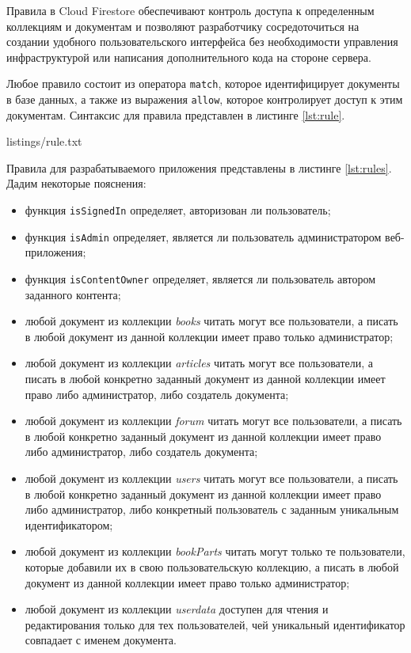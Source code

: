 Правила в Cloud Firestore обеспечивают контроль доступа к определенным коллекциям и документам и позволяют разработчику сосредоточиться на создании удобного пользовательского интерфейса без необходимости управления инфраструктурой или написания дополнительного кода на стороне сервера. 

Любое правило состоит из оператора \texttt{match}, которое идентифицирует документы в базе данных, а также из выражения \texttt{allow}, которое контролирует доступ к этим документам. Синтаксис для правила представлен в листинге \ref{lst:rule}.


{listings/rule.txt}

Правила для разрабатываемого приложения представлены в листинге \ref{lst:rules}. Дадим некоторые пояснения:

\begin{itemize}
	\item функция \texttt{isSignedIn} определяет, авторизован ли пользователь;
	\item функция \texttt{isAdmin} определяет, является ли пользователь администратором веб-приложения;
	\item функция \texttt{isContentOwner} определяет, является ли пользователь автором заданного контента;
	\item любой документ из коллекции \textit{books} читать могут все пользователи, а писать в любой документ из данной коллекции имеет право только администратор;
	\item любой документ из коллекции \textit{articles} читать могут все пользователи, а писать в любой конкретно заданный документ из данной коллекции имеет право либо администратор, либо создатель документа;
	\item любой документ из коллекции \textit{forum} читать могут все пользователи, а писать в любой конкретно заданный документ из данной коллекции имеет право либо администратор, либо создатель документа;
	\item любой документ из коллекции \textit{users} читать могут все пользователи, а писать в любой конкретно заданный документ из данной коллекции имеет право либо администратор, либо конкретный пользователь с заданным уникальным идентификатором;
	\item любой документ из коллекции \textit{bookParts} читать могут только те пользователи, которые добавили их в свою пользовательскую коллекцию, а писать в любой документ из данной коллекции имеет право только администратор;
	\item любой документ из коллекции \textit{userdata} доступен для чтения и редактирования только для тех пользователей, чей уникальный идентификатор совпадает с именем документа.
\end{itemize}

